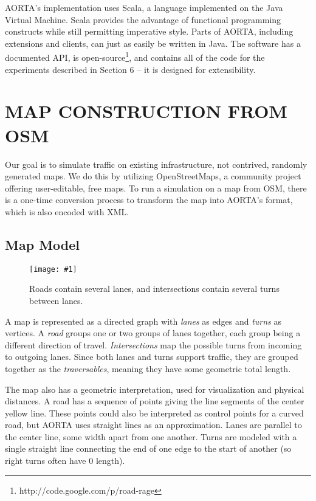 \documentclass[letterpaper, 10 pt, conference]{ieeeconf}  %
\newcommand{\pix}[3]{
  \begin{figure}[h]
    \centering \texttt{[image: \#1]}
    \caption{#2}
  \end{figure}
}
\begin{document}
AORTA's implementation uses Scala, a language implemented on the Java Virtual
Machine. Scala provides the advantage of functional programming constructs while
still permitting imperative style. Parts of AORTA, including extensions and clients, can
just as easily be written in Java. The software has a documented API, is
open-source\footnote{http://code.google.com/p/road-rage}, and contains all of
the code for the experiments described in Section 6 -- it is designed for
extensibility.


\section{MAP CONSTRUCTION FROM OSM}

Our goal is to simulate traffic on existing infrastructure, not contrived,
randomly generated maps. We do this by utilizing OpenStreetMaps, a community
project offering user-editable, free maps. To run a simulation on a map from
OSM, there is a one-time conversion process to transform the map into AORTA's
format, which is also encoded with XML.

\subsection{Map Model}

\pix{map_model.png}
    {Roads contain several lanes, and intersections contain several turns
     between lanes.}
    {scale=0.5}

A map is represented as a directed graph with \emph{lanes} as edges and
\emph{turns} as vertices. A \emph{road} groups one or two groups of lanes
together, each group being a different direction of travel.
\emph{Intersections} map the possible turns from incoming to outgoing lanes.
Since both lanes and turns support traffic, they are grouped together as the
\emph{traversables}, meaning they have some geometric total length.

The map also has a geometric interpretation, used for visualization and physical
distances. A road has a sequence of points giving the line segments of the
center yellow line. These points could also be interpreted as control points for
a curved road, but AORTA uses straight lines as an approximation. Lanes are
parallel to the center line, some width apart from one another.  Turns are
modeled with a single straight line connecting the end of one edge to the start
of another (so right turns often have $0$ length). 
\end{document}
